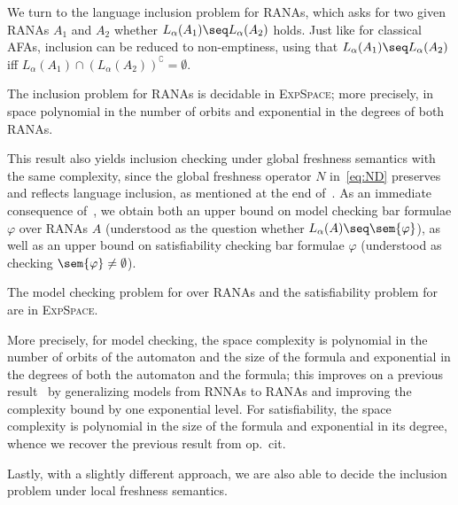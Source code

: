 \documentclass[10pt, final, conference, a4paper, twocolumn]{IEEEtran}
\newcommand{\EXPSPACE}{\textsc{ExpSpace}\xspace}
\begin{document}
We turn to the language inclusion problem for RANAs, which asks for two given RANAs $A_1$ and $A_2$ whether $L_\alpha(A_1) \seq L_\alpha(A_2)$ holds. Just like for classical AFAs, inclusion can be reduced to non-emptiness, using that $L_\alpha(A_1) \seq L_\alpha(A_2)$ iff $L_\alpha(A_1)\cap ({L_\alpha(A_2)})^\complement = \emptyset$.

\begin{theo} \label{thm:decincl}
  The inclusion problem for RANAs
  is decidable in \EXPSPACE; more precisely, 
  in space polynomial in the number of orbits and exponential in the degrees of both RANAs.
\end{theo}

\noindent %
This result also yields inclusion checking under
global freshness semantics with the same complexity, since the global
freshness operator $N$ in~\eqref{eq:ND} preserves and reflects
language inclusion, as mentioned at the end
of~. As an immediate consequence of~,
we obtain both an upper bound on model checking bar formulae $\varphi$ over  RANAs $A$ (understood as the
question whether $L_\alpha(A) \seq \sem{\varphi}$), as well as an upper bound on satisfiability checking bar formulae
$\varphi$ (understood as checking $\sem{\varphi} \neq \emptyset$).
\begin{cor}
  The model checking problem for \muBar{} over RANAs and the satisfiability problem for \muBar{} are in
  \EXPSPACE.
\end{cor}
\noindent
More precisely, for model checking, the space complexity is polynomial in the number of orbits of
the automaton and the size of the formula and exponential in the degrees of both the automaton
and the formula; this improves on a previous result~\cite[Thm.~7.2]{hms21} by generalizing models
from RNNAs to RANAs and improving the complexity bound by one exponential
level. For satisfiability, the space complexity is polynomial in the size of the formula and
exponential in its degree, whence we recover the previous result from op.~cit.

Lastly, with a slightly different approach, we are
also able to decide the inclusion problem under local freshness
semantics.
\end{document}

